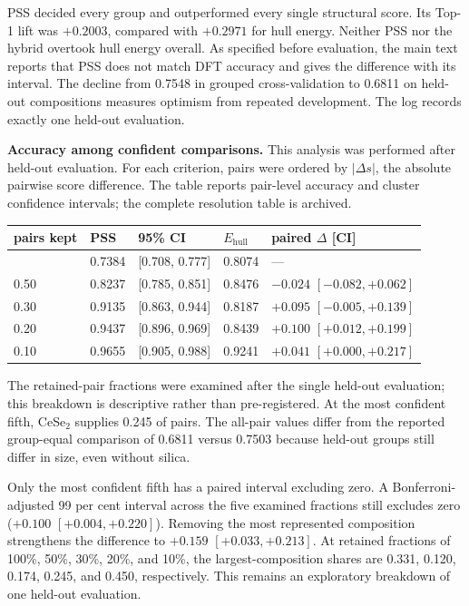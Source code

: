 PSS decided every group and outperformed every single structural score. Its
Top-1 lift was $+0.2003$, compared with $+0.2971$ for hull energy. Neither PSS
nor the hybrid overtook hull energy overall. As specified before evaluation, the
main text reports that PSS does not match DFT accuracy and gives the difference
with its interval. The decline from 0.7548 in grouped cross-validation to 0.6811
on held-out compositions measures optimism from repeated development. The log
records exactly one held-out evaluation.

\textbf{Accuracy among confident comparisons.} This analysis was performed after
held-out evaluation. For each criterion, pairs were ordered by $|\Delta s|$, the
absolute pairwise score difference. The table reports pair-level accuracy and
cluster confidence intervals; the complete resolution table is archived.

{\def\LTcaptype{none}
\begin{longtable}[]{@{}lllll@{}}
\toprule\noalign{}
pairs kept & PSS & 95\% CI & $E_{\mathrm{hull}}$ & paired $\Delta$ [CI] \\
\midrule\noalign{}
\endhead
\bottomrule\noalign{}
\endlastfoot
1.00 & 0.7384 & [0.708, 0.777] & 0.8074 & --- \\
0.50 & 0.8237 & [0.785, 0.851] & 0.8476 & $-0.024$ $[-0.082, +0.062]$ \\
0.30 & 0.9135 & [0.863, 0.944] & 0.8187 & $+0.095$ $[-0.005, +0.139]$ \\
0.20 & 0.9437 & [0.896, 0.969] & 0.8439 & $+0.100$ $[+0.012, +0.199]$ \\
0.10 & 0.9655 & [0.905, 0.988] & 0.9241 & $+0.041$ $[+0.000, +0.217]$ \\
\end{longtable}
}

The retained-pair fractions were examined after the single held-out evaluation;
this breakdown is descriptive rather than pre-registered. At the most confident
fifth, CeSe$_2$ supplies 0.245 of pairs. The all-pair values differ from the
reported group-equal comparison of 0.6811 versus 0.7503 because held-out groups
still differ in size, even without silica.

Only the most confident fifth has a paired interval excluding zero. A
Bonferroni-adjusted 99 per cent interval across the five examined fractions still
excludes zero ($+0.100$ $[+0.004,+0.220]$). Removing the most represented
composition strengthens the difference to $+0.159$ $[+0.033,+0.213]$. At
retained fractions of 100\%, 50\%, 30\%, 20\%, and 10\%, the largest-composition
shares are 0.331, 0.120, 0.174, 0.245, and 0.450, respectively. This remains an
exploratory breakdown of one held-out evaluation.


